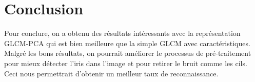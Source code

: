 \documentclass[12pt,twoside,letterpaper]{article}
\begin{document}
\section{Conclusion}
Pour conclure, on a obtenu des résultats intéressants avec la représentation GLCM-PCA qui est bien meilleure que la simple GLCM avec caractéristiques. Malgré les bons résultats, on pourrait améliorer le processus de pré-traitement pour mieux détecter l’iris dans l’image et pour retirer le bruit comme les cils. Ceci nous permettrait d'obtenir un meilleur taux de reconnaissance.

\newpage

\end{document}
